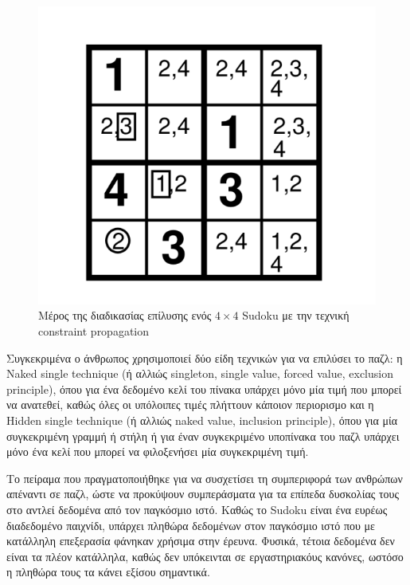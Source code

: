 \documentclass[oneside,12pt]{book}
\theoremstyle{definition}
\begin{document}
\begin{figure}[h]
	\centering
	\includegraphics[scale=0.45]{Figures/propagation.png}
	\caption{Μέρος της διαδικασίας επίλυσης ενός \(4 \times 4\) Sudoku με την τεχνική constraint propagation}
\end{figure}

Συγκεκριμένα ο άνθρωπος χρησιμοποιεί δύο είδη τεχνικών για να επιλύσει το παζλ: η Naked single technique (ή αλλιώς singleton, single value, forced value, exclusion
principle), όπου για ένα δεδομένο κελί του πίνακα υπάρχει μόνο μία τιμή που μπορεί να ανατεθεί, καθώς όλες οι υπόλοιπες τιμές πλήττουν κάποιον περιορισμο και η Hidden single technique (ή αλλιώς naked value, inclusion principle), όπου για μία συγκεκριμένη γραμμή ή στήλη ή για έναν συγκεκριμένο υποπίνακα του παζλ υπάρχει μόνο ένα κελί που μπορεί να φιλοξενήσει μία συγκεκριμένη τιμή. \par

Το πείραμα που πραγματοποιήθηκε για να συσχετίσει τη συμπεριφορά των ανθρώπων απέναντι σε παζλ, ώστε να προκύψουν συμπεράσματα για τα επίπεδα δυσκολίας τους στο \cite{5} αντλεί δεδομένα από τον παγκόσμιο ιστό. Καθώς το Sudoku είναι ένα ευρέως διαδεδομένο παιχνίδι, υπάρχει πληθώρα δεδομένων στον παγκόσμιο ιστό που με κατάλληλη επεξερασία φάνηκαν χρήσιμα στην έρευνα. Φυσικά, τέτοια δεδομένα δεν είναι τα πλέον κατάλληλα, καθώς δεν υπόκεινται σε εργαστηριακόυς κανόνες, ωστόσο η πληθώρα τους τα κάνει εξίσου σημαντικά. \par
\end{document}
